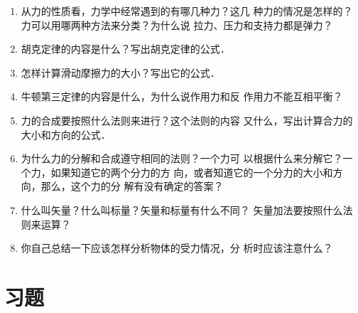 \begin{enumerate} 
\item 从力的性质看，力学中经常遇到的有哪几种力？这几
种力的情况是怎样的？力可以用哪两种方法来分类？为什么说
拉力、压力和支持力都是弹力？
\item
胡克定律的内容是什么？写出胡克定律的公式．
\item
怎样计算滑动摩擦力的大小？写出它的公式．
\item 牛顿第三定律的内容是什么，为什么说作用力和反
作用力不能互相平衡？
\item
力的合成要按照什么法则来进行？这个法则的内容
又什么，写出计算合力的大小和方向的公式．
\item
为什么力的分解和合成遵守相同的法则？一个力可
以根据什么来分解它？一个力，如果知道它的两个分力的方
向，或者知道它的一个分力的大小和方向，那么，这个力的分
解有没有确定的答案？
\item
什么叫矢量？什么叫标量？矢量和标量有什么不同？
矢量加法要按照什么法则来运算？
\item
你自己总结一下应该怎样分析物体的受力情况，分
析时应该注意什么？
\end{enumerate} 

\section*{习题} 

